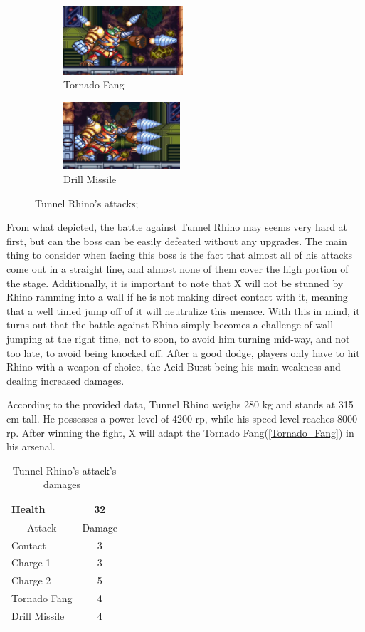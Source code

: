\begin{figure}[htp]
	\ContinuedFloat
	\centering
	\begin{subfigure}{.4\linewidth}
		\centering
		\includegraphics[height=2.56cm]{figures/X3/Tunnel_rhino/rhyno_tri.jpg}
		\caption{Tornado Fang}
	\end{subfigure}
	\begin{subfigure}{.4\linewidth}
		\centering
		\includegraphics[height=2.5cm]{figures/X3/Tunnel_rhino/rhyno_fang.jpg}
		\caption{Drill Missile}
	\end{subfigure}
	\caption{Tunnel Rhino's attacks;}
\end{figure}

From what depicted, the battle against Tunnel Rhino may seems very hard at first, but can the boss can be easily defeated without any upgrades. The main thing to consider when facing this boss is the fact that almost all of his attacks come out in a straight line, and almost none of them cover the high portion of the stage. Additionally, it is important to note that X will not be stunned by Rhino ramming into a wall if he is not making direct contact with it, meaning that a well timed jump off of it will neutralize this menace. With this in mind, it turns out that the battle against Rhino simply becomes a challenge of wall jumping at the right time, not to soon, to avoid him turning mid-way, and not too late, to avoid being knocked off. After a good dodge, players only have to hit Rhino with a weapon of choice, the Acid Burst being his main weakness and dealing increased damages. 

According to the provided data, Tunnel Rhino weighs 280 kg and stands at 315 cm tall. He possesses a power level of 4200 rp, while his speed level reaches 8000 rp. After winning the fight, X will adapt the Tornado Fang(\ref{Tornado_Fang}) in his arsenal.

\begin{table}[htp]
	\centering
	\begin{tabular}[h]{l c}
		\toprule
		Health  & 32\\
		\midrule
		\multicolumn{1}{c}{Attack} & \multicolumn{1}{c}{Damage}\\
		Contact & 3\\
		Charge 1& 3\\
		Charge 2& 5\\
		Tornado Fang& 4\\
		Drill Missile & 4\\
		\bottomrule
	\end{tabular}
	\caption{Tunnel Rhino's attack's damages~\cite{wiki:Tunnel_rhino,book:Compendium}}
\end{table} 


